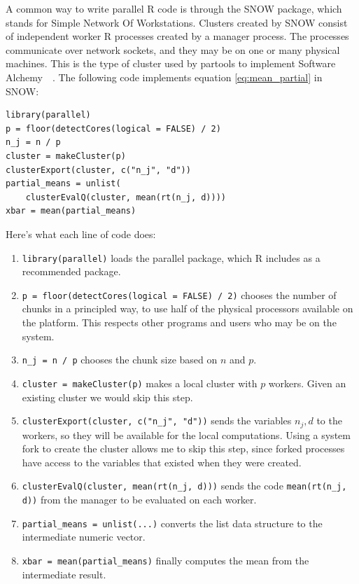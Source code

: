 \documentclass[12pt]{article}
\begin{document}
A common way to write parallel R code is through the SNOW package, which
stands for Simple Network Of Workstations.  Clusters created by SNOW
consist of independent worker R processes created by a manager process. The
processes communicate over network sockets, and they may be on one or many
physical machines.  This is the type of cluster used by partools to
implement Software Alchemy~\cite{R-partools}~\cite{matloff2014software}.
The following code implements equation \ref{eq:mean_partial} in SNOW:

\begin{verbatim}
library(parallel)
p = floor(detectCores(logical = FALSE) / 2)
n_j = n / p
cluster = makeCluster(p)
clusterExport(cluster, c("n_j", "d"))
partial_means = unlist(
    clusterEvalQ(cluster, mean(rt(n_j, d))))
xbar = mean(partial_means)
\end{verbatim}

Here's what each line of code does:

\begin{enumerate}
    \item \texttt{library(parallel)} loads the parallel package, which R
        includes as a recommended package.
    \item \texttt{p = floor(detectCores(logical = FALSE) / 2)}
        chooses the number of chunks in a principled way, to use half of
        the physical processors available on the platform. This respects
        other programs and users who may be on the system.
    \item \texttt{n\_j = n / p} chooses the chunk size based on $n$ and
        $p$. 
    \item \texttt{cluster = makeCluster(p)} makes a local cluster with $p$
        workers. Given an existing cluster we would skip this step.
    \item \texttt{clusterExport(cluster, c("n\_j", "d"))} sends the
        variables $n_j, d$ to the workers, so they will be available for
        the local computations.
        Using a system fork to create the cluster allows me to
        skip this step, since forked processes have access to the variables
        that existed when they were created.
    \item \texttt{clusterEvalQ(cluster, mean(rt(n\_j, d)))} sends the code
        \texttt{mean(rt(n\_j, d))} from the manager to be evaluated on each
        worker.
    \item \texttt{partial\_means = unlist(...)} converts the list data
        structure to the intermediate numeric vector.
    \item \texttt{xbar = mean(partial\_means)} finally computes the mean
        from the intermediate result.
\end{enumerate}
\end{document}
